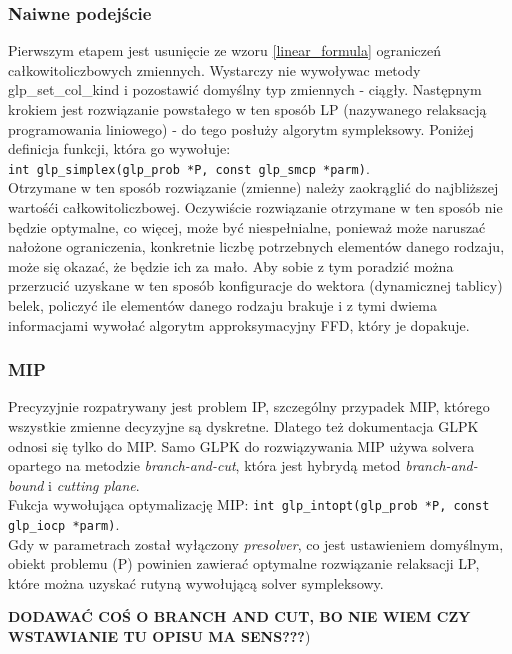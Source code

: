 \subsubsection{Naiwne podejście}
Pierwszym etapem jest usunięcie ze wzoru \ref{linear_formula} ograniczeń całkowitoliczbowych zmiennych. Wystarczy nie wywoływac metody glp\_set\_col\_kind i pozostawić domyślny typ zmiennych - ciągły. Następnym krokiem jest rozwiązanie powstałego w ten sposób LP (nazywanego relaksacją programowania liniowego) - do tego posłuży algorytm sympleksowy. Poniżej definicja funkcji, która go wywołuje:\\
\verb|int glp_simplex(glp_prob *P, const glp_smcp *parm)|. \\
Otrzymane w ten sposób rozwiązanie (zmienne) należy zaokrąglić do najbliższej wartośći całkowitoliczbowej. 
Oczywiście rozwiązanie otrzymane w ten sposób nie będzie optymalne, co więcej, może być niespełnialne, ponieważ może naruszać nałożone ograniczenia, konkretnie liczbę potrzebnych elementów danego rodzaju, może się okazać, że będzie ich za mało. Aby sobie z tym poradzić można przerzucić uzyskane w ten sposób konfiguracje do wektora (dynamicznej tablicy) belek, policzyć ile elementów danego rodzaju brakuje i z tymi dwiema informacjami wywołać algorytm approksymacyjny FFD, który je dopakuje.

\subsubsection{MIP}
Precyzyjnie rozpatrywany jest problem IP, szczególny przypadek MIP, którego wszystkie zmienne decyzyjne są dyskretne.
Dlatego też dokumentacja GLPK odnosi się tylko do MIP. Samo GLPK do rozwiązywania MIP używa solvera opartego na metodzie \textit{branch-and-cut}, która jest hybrydą metod \textit{branch-and-bound} i \textit{cutting plane}. \\
Fukcja wywołująca optymalizację MIP: \verb|int glp_intopt(glp_prob *P, const glp_iocp *parm)|. \\
Gdy w parametrach został wyłączony \textit{presolver}, co jest ustawieniem domyślnym, obiekt problemu (P) powinien zawierać optymalne rozwiązanie relaksacji LP, które można uzyskać rutyną wywołującą solver sympleksowy.

\textbf{DODAWAĆ COŚ O BRANCH AND CUT, BO NIE WIEM CZY WSTAWIANIE TU OPISU MA SENS???})


